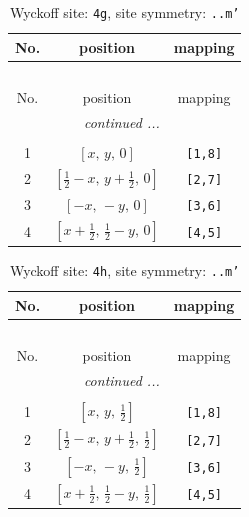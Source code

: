 \documentclass[fleqn,8pt]{jsarticle}
\begin{document}
\renewcommand{\arraystretch}{1.2}
\begin{longtable}{ccc}
\caption{Wyckoff site: {\tt 4g}, site symmetry: {\tt ..m'}}
 \\
 \hline \hline
No. & position & mapping \\ \hline \endfirsthead

\multicolumn{2}{l}{\tablename\ \thetable{}} \\
 \hline \hline
No. & position & mapping \\ \hline \endhead

 \hline \hline
\multicolumn{2}{r}{\footnotesize\it continued ...} \\ \endfoot

 \hline \hline
\multicolumn{2}{r}{} \\ \endlastfoot

1 & $\left[ x,\, y,\, 0 \right]$ & {\tt [1,8]} \\ \hline
2 & $\left[ \frac{1}{2} - x,\, y + \frac{1}{2},\, 0 \right]$ & {\tt [2,7]} \\ \hline
3 & $\left[ - x,\, - y,\, 0 \right]$ & {\tt [3,6]} \\ \hline
4 & $\left[ x + \frac{1}{2},\, \frac{1}{2} - y,\, 0 \right]$ & {\tt [4,5]} \\
\end{longtable}
\renewcommand{\arraystretch}{1.2}
\begin{longtable}{ccc}
\caption{Wyckoff site: {\tt 4h}, site symmetry: {\tt ..m'}}
 \\
 \hline \hline
No. & position & mapping \\ \hline \endfirsthead

\multicolumn{2}{l}{\tablename\ \thetable{}} \\
 \hline \hline
No. & position & mapping \\ \hline \endhead

 \hline \hline
\multicolumn{2}{r}{\footnotesize\it continued ...} \\ \endfoot

 \hline \hline
\multicolumn{2}{r}{} \\ \endlastfoot

1 & $\left[ x,\, y,\, \frac{1}{2} \right]$ & {\tt [1,8]} \\ \hline
2 & $\left[ \frac{1}{2} - x,\, y + \frac{1}{2},\, \frac{1}{2} \right]$ & {\tt [2,7]} \\ \hline
3 & $\left[ - x,\, - y,\, \frac{1}{2} \right]$ & {\tt [3,6]} \\ \hline
4 & $\left[ x + \frac{1}{2},\, \frac{1}{2} - y,\, \frac{1}{2} \right]$ & {\tt [4,5]} \\
\end{longtable}
\end{document}
